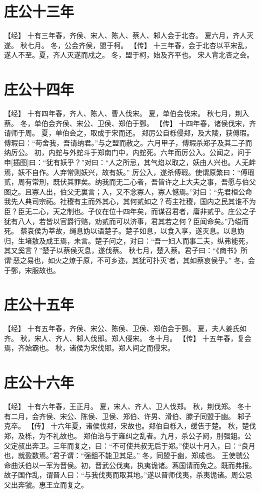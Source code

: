 \documentclass[a4paper,12pt,UTF8,twoside]{ctexbook}
\begin{document}
\section{庄公十三年}

【经】
十有三年春，齐侯、宋人、陈人、蔡人、邾人会于北杏。
夏六月，齐人灭遂。
秋七月。
冬，公会齐侯，盟于柯。
【传】
十三年春，会于北杏以平宋乱，遂人不至。夏，齐人灭遂而戍之。
冬，盟于柯，始及齐平也。
宋人背北杏之会。

\section{庄公十四年}

【经】
十有四年春，齐人、陈人、曹人伐宋。
夏，单伯会伐宋。
秋七月，荆入蔡。
冬，单伯会齐侯、宋公、卫侯、郑伯于鄄。
【传】
十四年春，诸侯伐宋，齐请师于周。
夏，单伯会之，取成于宋而还。
郑厉公自栎侵郑，及大陵，获傅瑕。傅瑕曰：“苟舍我，吾请纳君。”与之盟而赦之。六月甲子，傅瑕杀郑子及其二子而纳厉公。
初，内蛇与外蛇斗于郑南门中，内蛇死。六年而厉公入。公闻之，问于申[插图]曰：“犹有妖乎？”对曰：“人之所忌，其气焰以取之，妖由人兴也。人无衅焉，妖不自作。人弃常则妖兴，故有妖。”
厉公入，遂杀傅瑕。使谓原繁曰：“傅瑕贰，周有常刑，既伏其罪矣。纳我而无二心者，吾皆许之上大夫之事，吾愿与伯父图之。且寡人出，伯父无裏言；入，又不念寡人，寡人憾焉。”对曰：“先君桓公命我先人典司宗祏。社稷有主而外其心，其何贰如之？苟主社稷，国内之民其谁不为臣？臣无二心，天之制也。子仪在位十四年矣，而谋召君者，庸非贰乎。庄公之子犹有八人，若皆以官爵行赂，劝贰而可以济事，君其若之何？臣闻命矣。”乃缢而死。
蔡哀侯为莘故，绳息妫以语楚子。楚子如息，以食入享，遂灭息。以息妫归，生堵敖及成王焉，未言。楚子问之，对曰：“吾一妇人而事二夫，纵弗能死，其又奚言？”楚子以蔡侯灭息，遂伐蔡。
秋七月，楚入蔡。君子曰：“《商书》所谓‘恶之易也，如火之燎于原，不可乡迩，其犹可扑灭’者，其如蔡哀侯乎。”
冬，会于鄄，宋服故也。

\section{庄公十五年}

【经】
十有五年春，齐侯、宋公、陈侯、卫侯、郑伯会于鄄。
夏，夫人姜氏如齐。
秋，宋人、齐人、邾人伐郳。郑人侵宋。
冬十月。
【传】
十五年春，复会焉，齐始霸也。
秋，诸侯为宋伐郳。郑人间之而侵宋。

\section{庄公十六年}

【经】
十有六年春，王正月。
夏，宋人、齐人、卫人伐郑。
秋，荆伐郑。
冬十有二月，会齐侯、宋公、陈侯、卫侯、郑伯、许男、滑伯、滕子同盟于幽。
邾子克卒。
【传】
十六年夏，诸侯伐郑，宋故也。郑伯自栎入，缓告于楚。
秋，楚伐郑，及栎，为不礼故也。
郑伯治与于雍纠之乱者。九月，杀公子阏，刖强鉏。公父定叔出奔卫。三年而复之，曰：“不可使共叔无后于郑。”使以十月入，曰：“良月也，就盈数焉。”君子谓：“强鉏不能卫其足。”
冬，同盟于幽，郑成也。
王使虢公命曲沃伯以一军为晋侯。初，晋武公伐夷，执夷诡诸。蒍国请而免之。既而弗报。故子国作乱，谓晋人曰：“与我伐夷而取其地。”遂以晋师伐夷，杀夷诡诸。周公忌父出奔虢。惠王立而复之。
\end{document}
